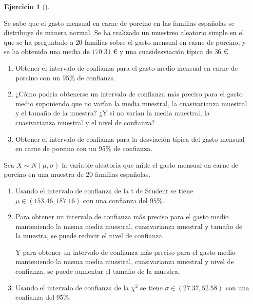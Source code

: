 \documentclass[
  spanish,
  a4paper,
]{scrreport}
\theoremstyle{definition}
\newtheorem{exercise}{Ejercicio}[chapter]
\theoremstyle{remark}
\begin{document}
\begin{exercise}[]\protect\hypertarget{exr-intervalo-confianza-media-carne-porcino}{}\label{exr-intervalo-confianza-media-carne-porcino}

Se sabe que el gasto mensual en carne de porcino en las familias
españolas se distribuye de manera normal. Se ha realizado un muestreo
aleatorio simple en el que se ha preguntado a \(20\) familias sobre el
gasto mensual en carne de porcino, y se ha obtenido una media de
\(170.31\) € y una cuasidesviación típica de \(36\) €.

\begin{enumerate}
\def\labelenumi{\alph{enumi}.}
\item
  Obtener el intervalo de confianza para el gasto medio mensual en carne
  de porcino con un 95\% de confianza.
\item
  ¿Cómo podría obtenerse un intervalo de confianza más preciso para el
  gasto medio suponiendo que no varían la media muestral, la
  cuasivarianza muestral y el tamaño de la muestra? ¿Y si no varían la
  media muestral, la cuasivarianza muestral y el nivel de confianza?
\item
  Obtener el intervalo de confianza para la desviación típica del gasto
  mensual en carne de porcino con un 95\% de confianza.
\end{enumerate}

\end{exercise}

\begin{tcolorbox}[enhanced jigsaw, arc=.35mm, bottomrule=.15mm, bottomtitle=1mm, breakable, colback=white, colbacktitle=quarto-callout-tip-color!10!white, colframe=quarto-callout-tip-color-frame, coltitle=black, left=2mm, leftrule=.75mm, opacityback=0, opacitybacktitle=0.6, rightrule=.15mm, title=\textcolor{quarto-callout-tip-color}{\faLightbulb}\hspace{0.5em}{Solución}, titlerule=0mm, toprule=.15mm, toptitle=1mm]

Sea \(X\sim N(\mu,\sigma)\) la variable aleatoria que mide el gasto
mensual en carne de porcino en una muestra de 20 familias españolas.

\begin{enumerate}
\def\labelenumi{\alph{enumi}.}
\item
  Usando el intervalo de confianza de la t de Student se tiene
  \(\mu \in (153.46, 187.16)\) con una confianza del \(95\)\%.
\item
  Para obtener un intervalo de confianza más preciso para el gasto medio
  manteniendo la misma media muestral, cuasivarianza muestral y tamaño
  de la muestra, se puede reducir el nivel de confianza.

  Y para obtener un intervalo de confianza más preciso para el gasto
  medio manteniendo la misma media muestral, cuasivarianza muestral y
  nivel de confianza, se puede aumentar el tamaño de la muestra.
\item
  Usando el intervalo de confianza de la \(\chi^2\) se tiene
  \(\sigma \in (27.37, 52.58)\) con una confianza del \(95\)\%.
\end{enumerate}

\end{tcolorbox}
\end{document}
